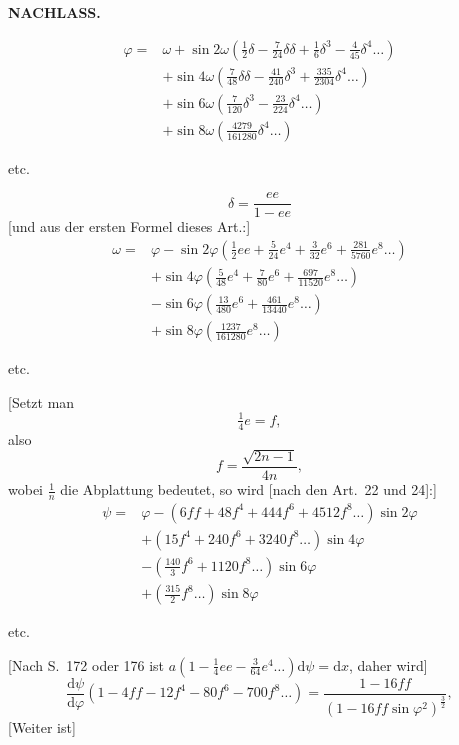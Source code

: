 \par\clearpage
{}\hfill{\small\textbf{NACHLASS.}}\hfill\null\par\medskip
\[
\begin{aligned}
\varphi={}&\omega+\sin2\omega(\tfrac12\delta-\tfrac7{24}\delta\delta+\tfrac16\delta^3-\tfrac4{45}\delta^4\ldots)\\
&+\sin4\omega(\tfrac7{48}\delta\delta-\tfrac{41}{240}\delta^3+\tfrac{335}{2304}\delta^4\ldots)\\
&+\sin6\omega(\tfrac7{120}\delta^3-\tfrac{23}{224}\delta^4\ldots)\\
&+\sin8\omega(\tfrac{4279}{161280}\delta^4\ldots)
\end{aligned}
\]
{\centering etc.\par}
\[\delta=\frac{ee}{1-ee}\]
[und aus der ersten Formel dieses Art.:]
\[
\begin{aligned}
\omega={}&\varphi-\sin2\varphi(\tfrac12ee+\tfrac5{24}e^4+\tfrac3{32}e^6+\tfrac{281}{5760}e^8\ldots)\\
&+\sin4\varphi(\tfrac5{48}e^4+\tfrac7{80}e^6+\tfrac{697}{11520}e^8\ldots)\\
&-\sin6\varphi(\tfrac{13}{480}e^6+\tfrac{461}{13440}e^8\ldots)\\
&+\sin8\varphi(\tfrac{1237}{161280}e^8\ldots)
\end{aligned}
\]
{\centering etc.\par}
\bigskip
{\centering [25.]\par}
[Setzt man
\[\tfrac14e=f,\]
\noindent also
\[f=\frac{\sqrt{2n-1}}{4n},\]
\noindent wobei \(\frac1n\) die Abplattung bedeutet, so wird [nach den Art.~22 und 24]:]
\[
\begin{aligned}
\psi={}&\varphi-(6ff+48f^4+444f^6+4512f^8\ldots)\sin2\varphi\\
&+(15f^4+240f^6+3240f^8\ldots)\sin4\varphi\\
&-(\tfrac{140}{3}f^6+1120f^8\ldots)\sin6\varphi\\
&+(\tfrac{315}{2}f^8\ldots)\sin8\varphi
\end{aligned}
\]
{\centering etc.\par}
[Nach S.~172 oder 176 ist \(a(1-\tfrac14ee-\tfrac3{64}e^4\ldots)\mathrm d\psi=\mathrm dx\), daher wird]
\[
\frac{\mathrm d\psi}{\mathrm d\varphi}(1-4ff-12f^4-80f^6-700f^8\ldots)=\frac{1-16ff}{(1-16ff\sin\varphi^2)^{\frac32}},
\]
[Weiter ist]

